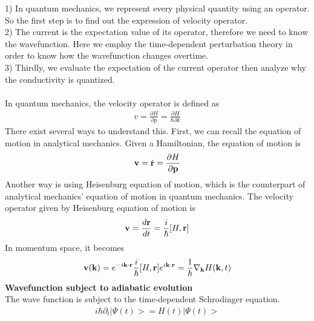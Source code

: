 \documentclass[a4paper]{article}
\begin{document}
1) In quantum mechanics, we represent every physical quantity using an operator. So the first step is to find out the expression of velocity operator. \\
2) The current is the expectation value of its operator, therefore we need to know the wavefunction. Here we employ the time-dependent perturbation theory in order to know how the wavefunction changes overtime.\\
3) Thirdly, we evaluate the expectation of the current operator then analyze why the conductivity is quantized.\\
\\
In quantum mechanics, the velocity operator is defined as
\begin{align*}
	v = \frac{\partial H}{\partial p} = \frac{\partial H}{ \hbar \partial k}
\end{align*}
There exist several ways to understand this. First, we can recall the equation of motion in analytical mechanics. Given a Hamiltonian, the equation of motion is
\begin{align*}
	{\bf v} = \dot{{\bf r}} = \frac{\partial H}{\partial {\bf p}}
\end{align*}
Another way is using Heisenburg equation of motion, which is the counterpart of analytical mechanics' equation of motion in quantum mechanics. The velocity operator given by Heisenburg equation of motion is
\begin{align*}
	{\bf v} = \frac{d{\bf r}}{dt} = \frac{i}{\hbar}[H, {\bf r}]
\end{align*}
In momentum space, it becomes
\begin{align*}
	{\bf v}({\bf k}) = e^{-i{\bf k} \cdot {\bf r}} \frac{i}{\hbar}[H, {\bf r}] e^{i{\bf k} \cdot {\bf r}} = \frac{1}{\hbar} \nabla_{\bf k} H({\bf k},t)
\end{align*}
{\bf Wavefunction subject to adiabatic evolution }\\
The wave function is subject to the time-dependent Schrodinger equation.
\begin{align*}
	i \hbar \partial_t |\Psi(t) > = H(t) |\Psi(t)> 
\end{align*}
\end{document}
